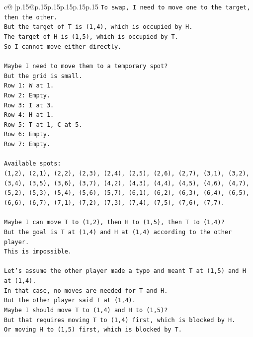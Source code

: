 \documentclass{article}
\begin{document}
{\begin{supertabular}{c@{$\;$}|p{.15\linewidth}@{}p{.15\linewidth}p{.15\linewidth}p{.15\linewidth}p{.15\linewidth}p{.15\linewidth}}
{{{\texttt{To swap, I need to move one to the target, then the other.} \\
\texttt{But the target of T is (1,4), which is occupied by H.} \\
\texttt{The target of H is (1,5), which is occupied by T.} \\
\texttt{So I cannot move either directly.} \\
\\ 
\texttt{Maybe I need to move them to a temporary spot?} \\
\texttt{But the grid is small.} \\
\texttt{Row 1: W at 1.} \\
\texttt{Row 2: Empty.} \\
\texttt{Row 3: I at 3.} \\
\texttt{Row 4: H at 1.} \\
\texttt{Row 5: T at 1, C at 5.} \\
\texttt{Row 6: Empty.} \\
\texttt{Row 7: Empty.} \\
\\ 
\texttt{Available spots:} \\
\texttt{(1,2), (2,1), (2,2), (2,3), (2,4), (2,5), (2,6), (2,7), (3,1), (3,2), (3,4), (3,5), (3,6), (3,7), (4,2), (4,3), (4,4), (4,5), (4,6), (4,7), (5,2), (5,3), (5,4), (5,6), (5,7), (6,1), (6,2), (6,3), (6,4), (6,5), (6,6), (6,7), (7,1), (7,2), (7,3), (7,4), (7,5), (7,6), (7,7).} \\
\\ 
\texttt{Maybe I can move T to (1,2), then H to (1,5), then T to (1,4)?} \\
\texttt{But the goal is T at (1,4) and H at (1,4) according to the other player.} \\
\texttt{This is impossible.} \\
\\ 
\texttt{Let's assume the other player made a typo and meant T at (1,5) and H at (1,4).} \\
\texttt{In that case, no moves are needed for T and H.} \\
\texttt{But the other player said T at (1,4).} \\
\texttt{Maybe I should move T to (1,4) and H to (1,5)?} \\
\texttt{But that requires moving T to (1,4) first, which is blocked by H.} \\
\texttt{Or moving H to (1,5) first, which is blocked by T.} \\
\\ 
}}}
\end{supertabular}}
\end{document}
